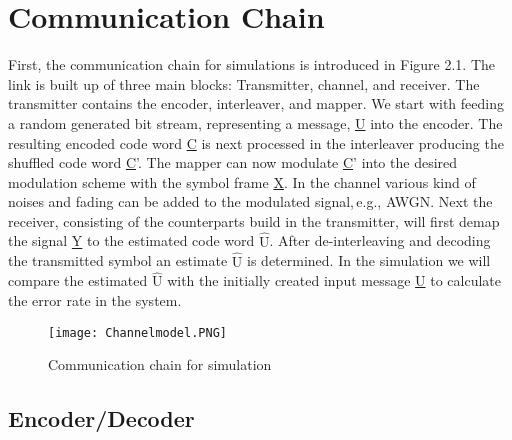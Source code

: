 \chapter{Communication Chain} 
\label{chap:commchain}
\graphicspath{{C:/Users/Kevin/Bachelarbeit/Bachelorarbeit/01_Bachelorarbeit_LaTex/02_Figures/}}


First, the communication chain for simulations is introduced in Figure 2.1. The link is built up of three main blocks: Transmitter, channel, and receiver. The transmitter contains the encoder, interleaver, and mapper. We start with feeding a random generated bit stream, representing a message, \underline{U} into the encoder. The resulting encoded code word \underline{C} is next processed in the interleaver producing the shuffled code word \underline{C}'. The mapper can now modulate \underline{C}' into the desired modulation scheme with the symbol frame \underline{X}. In the channel various kind of noises and fading can be added to the modulated signal,\,e.g., \gls{AWGN}. Next the receiver, consisting of the counterparts build in the transmitter, will first demap the signal \underline{Y} to the estimated code word \underline{$\hat{\textrm{U}}$}. After de-interleaving and decoding the transmitted symbol an estimate \underline{$\hat{\textrm{U}}$} is determined. In the simulation we will compare the estimated \underline{$\hat{\textrm{U}}$} with the initially created input message \underline{U} to calculate the error rate in the system.
\begin{figure}[!htb]
	\centering
	\texttt{[image: Channelmodel.PNG]}
	\caption{Communication chain for simulation}
	\label{fig:commchain}
\end{figure}

\section{Encoder/Decoder}
\label{sec:enc}

